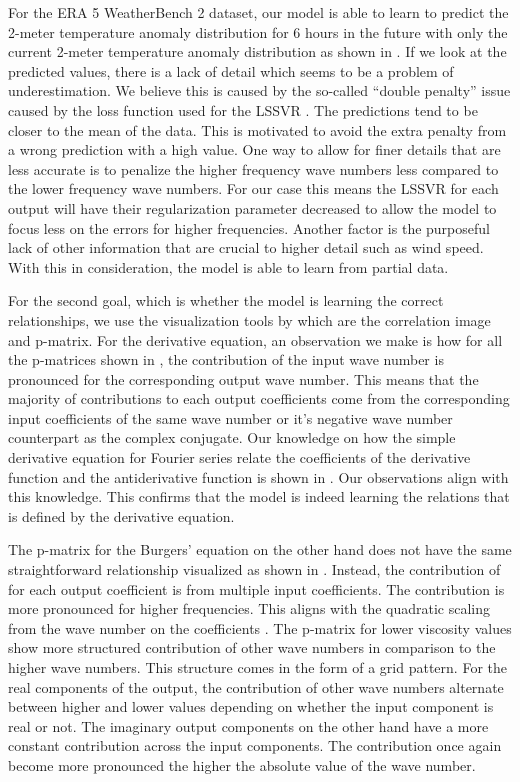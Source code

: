 For the ERA 5 WeatherBench 2 dataset, our model is able to learn to predict the 2-meter temperature anomaly distribution for 6 hours in the future with only the current 2-meter temperature anomaly distribution as shown in . If we look at the predicted values, there is a lack of detail which seems to be a problem of underestimation. We believe this is caused by the so-called \enquote{double penalty} issue caused by the loss function used for the LSSVR \autocite{lledoScaledependentVerificationPrecipitation2023}. The predictions tend to be closer to the mean of the data. This is motivated to avoid the extra penalty from a wrong prediction with a high value. One way to allow for finer details that are less accurate is to penalize the higher frequency wave numbers less compared to the lower frequency wave numbers. For our case this means the LSSVR for each output will have their regularization parameter decreased to allow the model to focus less on the errors for higher frequencies. Another factor is the purposeful lack of other information that are crucial to higher detail such as wind speed. With this in consideration, the model is able to learn from partial data.

For the second goal, which is whether the model is learning the correct relationships, we use the visualization tools by \textcite{ustunVisualisationInterpretationSupport2007} which are the correlation image and p-matrix. For the derivative equation, an observation we make is how for all the p-matrices shown in , the contribution of the input wave number is pronounced for the corresponding output wave number. This means that the majority of contributions to each output coefficients come from the corresponding input coefficients of the same wave number or it's negative wave number counterpart as the complex conjugate. Our knowledge on how the simple derivative equation for Fourier series relate the coefficients of the derivative function and the antiderivative function is shown in . Our observations align with this knowledge. This confirms that the model is indeed learning the relations that is defined by the derivative equation.

The p-matrix for the Burgers' equation on the other hand does not have the same straightforward relationship visualized as shown in . Instead, the contribution of for each output coefficient is from multiple input coefficients. The contribution is more pronounced for higher frequencies. This aligns with the quadratic scaling from the wave number on the coefficients \autocite{canutoSpectralMethodsEvolution2007}. The p-matrix for lower viscosity values show more structured contribution of other wave numbers in comparison to the higher wave numbers. This structure comes in the form of a grid pattern. For the real components of the output, the contribution of other wave numbers alternate between higher and lower values depending on whether the input component is real or not. The imaginary output components on the other hand have a more constant contribution across the input components. The contribution once again become more pronounced the higher the absolute value of the wave number.

